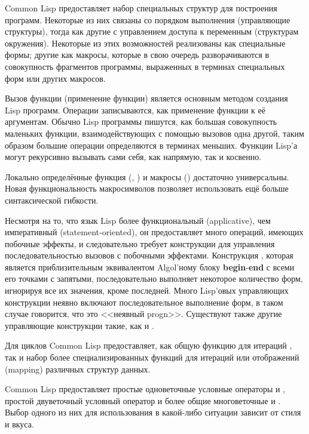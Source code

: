 Common Lisp предоставляет набор специальных структур для построения
программ. Некоторые из них связаны со порядком выполнения (управляющие
структуры), тогда как другие с управлением доступа к переменным (структурам
окружения).
Некоторые из этих возможностей реализованы как специальные формы;
другие как макросы, которые в свою очередь разворачиваются в совокупность
фрагментов программы, выраженных в терминах специальных форм или других
макросов.

Вызов функции (применение функции) является основным методом создания Lisp
программ. Операции записываются, как применение функции к её аргументам. Обычно
Lisp программы пишутся, как большая совокупность маленьких функции,
взаимодействующих с помощью вызовов одна другой, таким образом большие операции
определяются в терминах меньших.
Функции Lisp'а могут рекурсивно вызывать сами себя, как напрямую, так и косвенно.

\begin{new}
Локально определённые функция (, ) и макросы
() достаточно универсальны.
Новая функциональность макросимволов позволяет использовать ещё больше синтаксической гибкости.
\end{new}


Несмотря на то, что язык Lisp более функциональный (applicative), чем императивный
(statement-oriented), он предоставляет много операций, имеющих побочные эффекты,
и следовательно требует конструкции для управления последовательностью вызовов с
побочными эффектами. Конструкция , которая является приблизительным
эквивалентом Algol'ному блоку \textbf{begin}-\textbf{end} с всеми его точками с
запятыми, последовательно выполняет некоторое количество форм, игнорируя все их
значения, кроме последней.
Много Lisp'овых управляющих конструкции неявно включают последовательное
выполнение форм, в таком случае говорится, что это <<неявный progn>>.
Существуют также другие управляющие конструкции такие, как  и
.

Для циклов Common Lisp предоставляет, как общую функцию для итераций ,
так и набор более специализированных функций для итераций или отображений
(mapping) различных структур данных.

Common Lisp предоставляет простые одноветочные условные операторы  и
, простой двуветочный условный оператор  и более общие
многоветочные  и . Выбор одного из них для использования в
какой-либо ситуации зависит от стиля и вкуса.

